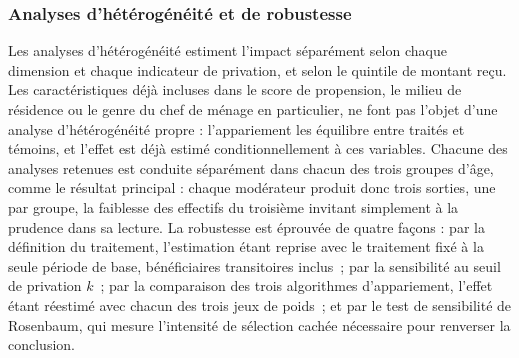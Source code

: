 \subsubsection{Analyses d'hétérogénéité et de robustesse}
\label{subsec:robustesse}

Les analyses d'hétérogénéité estiment l'impact séparément selon chaque
dimension et chaque indicateur de privation, et selon le quintile de
montant reçu. Les caractéristiques déjà incluses dans le score de
propension, le milieu de résidence ou le genre du chef de ménage en
particulier, ne font pas l'objet d'une analyse d'hétérogénéité propre :
l'appariement les équilibre entre traités et témoins, et l'effet est déjà
estimé conditionnellement à ces variables. Chacune des analyses retenues
est conduite séparément dans chacun des trois groupes d'âge, comme le
résultat principal : chaque modérateur produit donc trois sorties, une
par groupe, la faiblesse des effectifs du troisième invitant simplement à
la prudence dans sa lecture. La robustesse est
éprouvée de quatre façons : par la définition du traitement, l'estimation
étant reprise avec le traitement fixé à la seule période de base,
bénéficiaires transitoires inclus~; par la sensibilité au seuil de
privation $k$~; par la comparaison des trois algorithmes d'appariement,
l'effet étant réestimé avec chacun des trois jeux de poids~; et par le
test de sensibilité de Rosenbaum, qui mesure l'intensité de sélection
cachée nécessaire pour renverser la conclusion.
